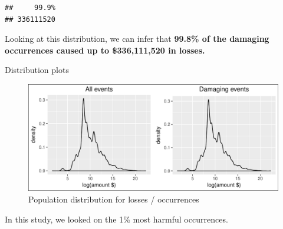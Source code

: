 \documentclass[]{article}
\begin{document}
\begin{verbatim}
##     99.9% 
## 336111520
\end{verbatim}

Looking at this distribution, we can infer that \textbf{99.8\% of the
damaging occurrences caused up to \$336,111,520 in losses.}

Distribution plots

\begin{figure}[htbp]
\centering
\includegraphics{readme_files/figure-latex/crop-distr-4-1.pdf}
\caption{Population distribution for losses / occurrences}
\end{figure}

In this study, we looked on the 1\% most harmful occurrences.
\end{document}
